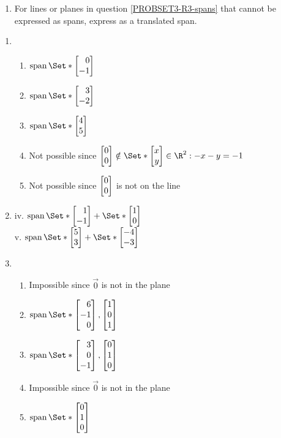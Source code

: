 \begin{exercises}
\begin{problist}
\begin{enumerate}
			\item For lines or planes in question \ref{PROBSET3-R3-spans} that cannot
				be expressed as spans, express as a translated
				span.
		\end{enumerate}
		\begin{solution}
			\begin{enumerate}
				\item
					\begin{enumerate}
					    \item $\Span\Set*{\mat{0\\-1}}$
					    \item $\Span\Set*{\mat{3\\-2}}$
					    \item $\Span\Set*{\mat{4\\5}}$
					    \item Not possible since $\mat{0\\0}\notin \Set*{\mat{x\\y}\in \R^2: -x-y=-1}$
					    \item Not possible since $\mat{0\\0}$ is not on the line
					\end{enumerate}
				\item
				    	iv. $\Span\Set*{\mat{1\\-1}} + \Set*{\mat{1\\0}}$\\
				    	v. $\Span\Set*{\mat{5\\3}} + \Set*{\mat{-4\\-3}}$
				\item 
				    \begin{enumerate}
					\item Impossible since $\vec {0}$ is not in the plane
					\item $\Span\Set*{\mat{6\\-1\\0}, \mat{1\\0\\1}}$
					\item $\Span\Set*{\mat{3\\0\\-1}, \mat{0\\1\\0}}$
					\item Impossible since $\vec {0}$ is not in the plane
					\item $\Span\Set*{\mat{0\\1\\0}}$

\end{enumerate}
\end{enumerate}
\end{solution}
\end{problist}
\end{exercises}
